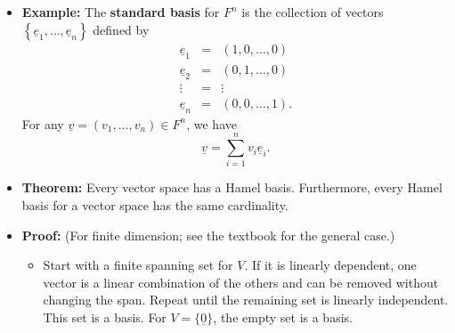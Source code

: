 \documentclass[11pt,twoside]{report}
\newcommand{\vecnot}{\underline}
\begin{document}
\begin{itemize}
\item \textbf{Example:}  The \textbf{standard basis} for $F^n$ is the collection of vectors  $\left\{ \vecnot{e}_1, \ldots, \vecnot{e}_n \right\}$ defined by
\begin{equation*}
\begin{array}{ccc}
\vecnot{e}_1 & = & (1, 0, \ldots, 0) \\
\vecnot{e}_2 & = & (0, 1, \ldots, 0) \\
\vdots & = & \vdots \\
\vecnot{e}_n & = & (0, 0, \ldots, 1).
\end{array}
\end{equation*}
For any $\vecnot{v} = (v_1, \ldots, v_n) \in F^n$, we have
\begin{equation*} %
\vecnot{v} = \sum_{i=1}^n v_i \vecnot{e}_i.
\end{equation*}



\item \textbf{Theorem:}  
Every vector space has a Hamel basis. Furthermore, every Hamel basis for a vector space has the same cardinality. 



\item \textbf{Proof:} (For finite dimension; see the textbook for the general case.)
\begin{itemize}

\item Start with a finite spanning set for $V$.  If it is linearly dependent, one vector is a linear combination of the others and can be removed without changing the span.  Repeat until the remaining set is linearly independent.  This set is a basis.  For $V=\{\vecnot{0}\}$, the empty set is a basis.


\end{itemize}
\end{itemize}
\end{document}
